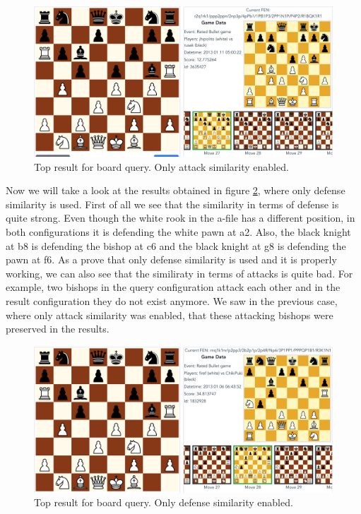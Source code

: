 \documentclass[11pt]{article}
\begin{document}
    \begin{figure}[H]
        \centering
        \includegraphics[width=14cm]{images/Attack}
        \caption{Top result for board query. Only attack similarity enabled.}
        \label{fig:Attack}
    \end{figure}

    Now we will take a look at the results obtained in figure \ref{fig:Defense}, where only defense similarity is used. First of all we see that the similarity in terms of defense is quite strong. Even though the white rook in the a-file has a different position, in both configurations it is defending the white pawn at a2. Also, the black knight at b8 is defending the bishop at c6 and the black knight at g8 is defending the pawn at f6. As a prove that only defense similarity is used and it is properly working, we can also see that the similiraty in terms of attacks is quite bad. For example, two bishops in the query configuration attack each other and in the result configuration they do not exist anymore. We saw in the previous case, where only attack similarity was enabled, that these attacking bishops were preserved in the results.

    \begin{figure}[H]
        \centering
        \includegraphics[width=14cm]{images/Defense}
        \caption{Top result for board query. Only defense similarity enabled.}
        \label{fig:Defense}
    \end{figure}
\end{document}
